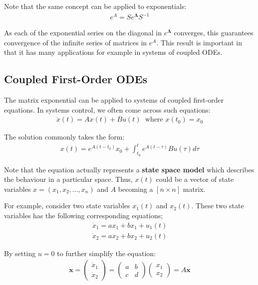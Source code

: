 \documentclass[10pt,a4paper]{article}
\begin{document}
Note that the same concept can be applied to exponentials:
\begin{align*}
    e^A = S e^\mathbf{\Lambda}   S^{-1}
\end{align*}

As each of the exponential series on the diagonal in $e^\mathbf{\Lambda}$ converges, this guarantees
convergence of the inﬁnite series of matrices in $e^A$. This result is important in that it has many
applications for example in systems of coupled ODEs. 

\pagebreak

\subsection{Coupled First-Order ODEs}

The matrix exponential can be applied to systems of coupled ﬁrst-order equations. In systems
control, we often come across such equations:
\begin{align*}
    \dot{x}(t) = Ax(t) + Bu(t) \; \text{ where } x(t_0) = x_0
\end{align*}

The solution commonly takes the form:
\begin{align*}
    x(t) = e^{A(t-t_0)}x_0 + \int_{t_0}^t e^{A(t-\tau)}B u(\tau) d\tau
\end{align*}

Note that the equation actually represents a \textbf{state space model} which describes the
behaviour in a particular space. Thus, $x(t)$ could be a vector of state variables $x = (x_1, x_2,
\dots, x_n)$ and $A$ becoming a $[n\times n]$ matrix. 

For example, consider two state variables $x_1(t)$ and $x_2(t)$. These two state variables has the
following corresponding equations;
\begin{align*}
    \dot{x}_1 = ax_1 + bx_1 + u_1(t) \\
    \dot{x}_2 = ax_2 + bx_2 + u_2(t)
\end{align*}

By setting $u = 0$ to further simplify the equation:
\begin{align*}
    \dot{\textbf{x}} = \begin{pmatrix}
        \dot{x}_1 \\
        \dot{x}_2
    \end{pmatrix} = \begin{pmatrix}
        a&b\\c&d
    \end{pmatrix}\begin{pmatrix}
        x_1\\x_2
    \end{pmatrix} = A \textbf{x}    
\end{align*}
\end{document}
